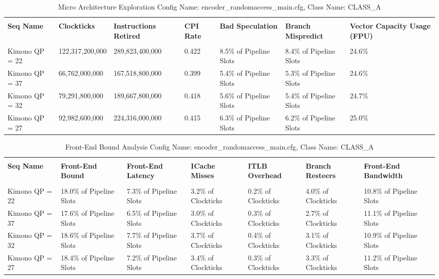 \documentclass{article}%
\begin{document}
\newpage%
\begin{longtabu}{| X[l] | X[l] | X[l] | X[l] | X[l] | X[l] | X[l] |}%
\caption{%
Micro Architecture Exploration\newline%
 Config Name: encoder\_randomaccess\_main.cfg,\newline%
 Class Name: CLASS\_A\newline%
%
}%
\hline%
&&&&&&\\%
\textbf{Seq Name}&\textbf{Clockticks}&\textbf{Instructions Retired}&\textbf{CPI Rate}&\textbf{Bad Speculation}&\textbf{Branch Mispredict}&\textbf{Vector Capacity Usage (FPU)}\\%
&&&&&&\\%
\hline%
\endhead%
Kimono\newline%
 QP = 22&122,317,200,000&289,823,400,000&0.422&8.5\% of Pipeline Slots&8.4\% of Pipeline Slots&24.6\%\\%
\hline%
Kimono\newline%
 QP = 37&66,762,000,000&167,518,800,000&0.399&5.4\% of Pipeline Slots&5.3\% of Pipeline Slots&24.6\%\\%
\hline%
Kimono\newline%
 QP = 32&79,291,800,000&189,667,800,000&0.418&5.6\% of Pipeline Slots&5.4\% of Pipeline Slots&24.7\%\\%
\hline%
Kimono\newline%
 QP = 27&92,982,600,000&224,316,000,000&0.415&6.3\% of Pipeline Slots&6.2\% of Pipeline Slots&25.0\%\\%
\hline%
\end{longtabu}%
\begin{longtabu}{| X[l] | X[l] | X[l] | X[l] | X[l] | X[l] | X[l] |}%
\caption{%
Front{-}End Bound Analysis\newline%
 Config Name: encoder\_randomaccess\_main.cfg,\newline%
 Class Name: CLASS\_A\newline%
%
}%
\hline%
&&&&&&\\%
\textbf{Seq Name}&\textbf{Front{-}End Bound}&\textbf{Front{-}End Latency}&\textbf{ICache Misses}&\textbf{ITLB Overhead}&\textbf{Branch Resteers}&\textbf{Front{-}End Bandwidth}\\%
&&&&&&\\%
\hline%
\endhead%
Kimono\newline%
 QP = 22&18.0\% of Pipeline Slots&7.3\% of Pipeline Slots&3.2\% of Clockticks&0.2\% of Clockticks&4.0\% of Clockticks&10.8\% of Pipeline Slots\\%
\hline%
Kimono\newline%
 QP = 37&17.6\% of Pipeline Slots&6.5\% of Pipeline Slots&3.0\% of Clockticks&0.3\% of Clockticks&2.7\% of Clockticks&11.1\% of Pipeline Slots\\%
\hline%
Kimono\newline%
 QP = 32&18.6\% of Pipeline Slots&7.7\% of Pipeline Slots&3.7\% of Clockticks&0.4\% of Clockticks&3.1\% of Clockticks&10.9\% of Pipeline Slots\\%
\hline%
Kimono\newline%
 QP = 27&18.4\% of Pipeline Slots&7.2\% of Pipeline Slots&3.4\% of Clockticks&0.3\% of Clockticks&3.3\% of Clockticks&11.2\% of Pipeline Slots\\%
\hline%
\end{longtabu}%
\end{document}
